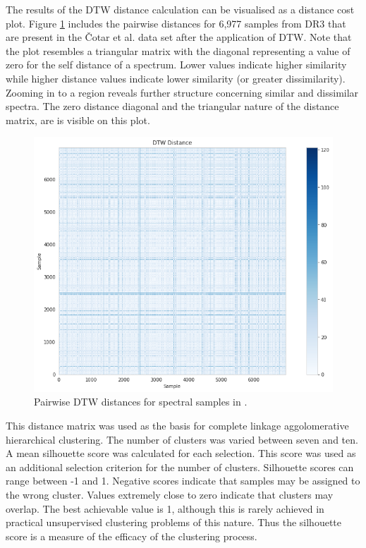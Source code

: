 The results of the DTW distance calculation can be visualised as a distance cost plot. Figure \ref{fig4.3} includes the pairwise distances for 6,977 samples from DR3 that are present in the Čotar et al. data set after the application of DTW. Note that the plot resembles a triangular matrix with the diagonal representing a value of zero for the self distance of a spectrum. Lower values indicate higher similarity while higher distance values indicate lower similarity (or greater dissimilarity). Zooming in to a region reveals further structure concerning similar and dissimilar spectra. The zero distance diagonal and the triangular nature of the distance matrix, are is visible on this plot.

\begin{figure}[!htb]
\centering
\includegraphics[scale=0.60]{figures/dtw cotar.png}
\caption{Pairwise DTW distances for spectral samples in \citet{vcotar2021galah}.}
\label{fig4.3}
\end{figure}

This distance matrix was used as the basis for complete linkage aggolomerative hierarchical clustering. The number of clusters was varied between seven and ten. A mean silhouette score was calculated for each selection. This score was used as an additional selection criterion for the number of clusters. Silhouette scores can range between -1 and 1. Negative scores indicate that samples may be assigned to the wrong cluster. Values extremely close to zero indicate that clusters may overlap. The best achievable value is 1, although this is rarely achieved in practical unsupervised clustering problems of this nature. Thus the silhouette score is a measure of the efficacy of the clustering process.


